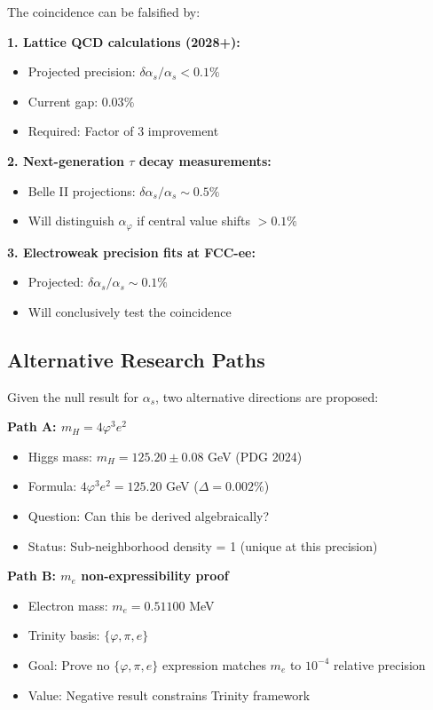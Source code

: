 \documentclass{article}
\begin{document}
The coincidence can be falsified by:

\textbf{1. Lattice QCD calculations (2028+):}
\begin{itemize}
\item Projected precision: $\delta\alpha_s/\alpha_s < 0.1\%$
\item Current gap: $0.03\%$
\item Required: Factor of 3 improvement
\end{itemize}

\textbf{2. Next-generation $\tau$ decay measurements:}
\begin{itemize}
\item Belle II projections: $\delta\alpha_s/\alpha_s \sim 0.5\%$
\item Will distinguish $\alpha_\varphi$ if central value shifts $> 0.1\%$
\end{itemize}

\textbf{3. Electroweak precision fits at FCC-ee:}
\begin{itemize}
\item Projected: $\delta\alpha_s/\alpha_s \sim 0.1\%$
\item Will conclusively test the coincidence
\end{itemize}

\subsection{Alternative Research Paths}

Given the null result for $\alpha_s$, two alternative directions are proposed:

\textbf{Path A: $m_H = 4\varphi^3 e^2$}
\begin{itemize}
\item Higgs mass: $m_H = 125.20 \pm 0.08$ GeV (PDG 2024)
\item Formula: $4\varphi^3 e^2 = 125.20$ GeV ($\Delta = 0.002\%$)
\item Question: Can this be derived algebraically?
\item Status: Sub-neighborhood density = 1 (unique at this precision)
\end{itemize}

\textbf{Path B: $m_e$ non-expressibility proof}
\begin{itemize}
\item Electron mass: $m_e = 0.51100$ MeV
\item Trinity basis: $\{\varphi, \pi, e\}$
\item Goal: Prove no $\{\varphi, \pi, e\}$ expression matches $m_e$ to $10^{-4}$ relative precision
\item Value: Negative result constrains Trinity framework
\end{itemize}
\end{document}
